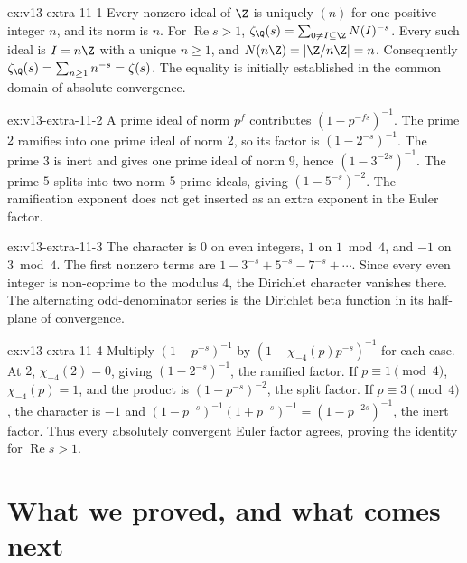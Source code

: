 \begin{solution}{ex:v13-extra-11-1}
\idea Every nonzero ideal of $\Z$ is uniquely $(n)$ for one positive integer $n$, and its norm is $n$.
\writeup For $\operatorname{Re}s>1$, $\zeta_{\Q}(s)=\sum_{0\ne I\subseteq\Z}N(I)^{-s}$. Every such ideal is $I=n\Z$ with a unique $n\ge1$, and $N(n\Z)=|\Z/n\Z|=n$. Consequently $\zeta_{\Q}(s)=\sum_{n\ge1}n^{-s}=\zeta(s)$. The equality is initially established in the common domain of absolute convergence.
\end{solution}

\begin{solution}{ex:v13-extra-11-2}
\idea A prime ideal of norm $p^f$ contributes $(1-p^{-fs})^{-1}$.
\writeup The prime $2$ ramifies into one prime ideal of norm $2$, so its factor is $(1-2^{-s})^{-1}$. The prime $3$ is inert and gives one prime ideal of norm $9$, hence $(1-3^{-2s})^{-1}$. The prime $5$ splits into two norm-$5$ prime ideals, giving $(1-5^{-s})^{-2}$. The ramification exponent does not get inserted as an extra exponent in the Euler factor.
\end{solution}

\begin{solution}{ex:v13-extra-11-3}
\idea The character is $0$ on even integers, $1$ on $1\bmod4$, and $-1$ on $3\bmod4$.
\writeup The first nonzero terms are $1-3^{-s}+5^{-s}-7^{-s}+\cdots$. Since every even integer is non-coprime to the modulus $4$, the Dirichlet character vanishes there. The alternating odd-denominator series is the Dirichlet beta function in its half-plane of convergence.
\end{solution}

\begin{solution}{ex:v13-extra-11-4}
\idea Multiply $(1-p^{-s})^{-1}$ by $(1-\chi_{-4}(p)p^{-s})^{-1}$ for each case.
\writeup At $2$, $\chi_{-4}(2)=0$, giving $(1-2^{-s})^{-1}$, the ramified factor. If $p\equiv1\pmod4$, $\chi_{-4}(p)=1$, and the product is $(1-p^{-s})^{-2}$, the split factor. If $p\equiv3\pmod4$, the character is $-1$ and $(1-p^{-s})^{-1}(1+p^{-s})^{-1}=(1-p^{-2s})^{-1}$, the inert factor. Thus every absolutely convergent Euler factor agrees, proving the identity for $\operatorname{Re}s>1$.
\end{solution}

\section{What we proved, and what comes next}

